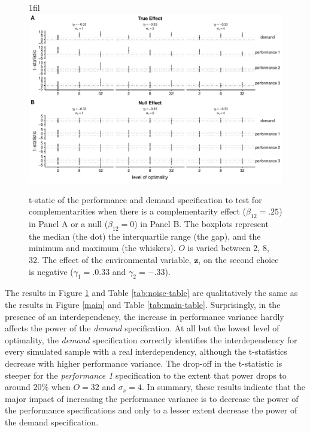 \documentclass[12pt]{article}
\makeatletter
\newcommand*{\centerfloat}{%
  \parindent \z@
  \leftskip \z@ \@plus 1fil \@minus \textwidth
  \rightskip\leftskip
  \parfillskip \z@skip}
\makeatother
\begin{document}
\begin{figure}
\centerfloat
\includegraphics[width=450px]{figure-latex/noise_new_plot.pdf}
\caption[Error Rate and Power with Increasing Levels of Variability in Performance]
{\label{noise} t-static of the performance and demand specification to test
for complementarities when there is a complementarity effect ($\beta_{12} = .25$)
in Panel A or a null ($\beta_{12} = 0$) in Panel B. The boxplots represent the median (the dot) the interquartile range (the gap), and the minimum and maximum (the whiskers). $O$ is varied between 2, 8, 32. The effect of the environmental variable, $\mathbf{z}$, on the second choice is negative ($\gamma_1 = .0.33$ and $\gamma_2 = -.33$).}
\end{figure}



The results in Figure \ref{noise} and Table \ref{tab:noise-table} are qualitatively the same as the results in Figure \ref{main} and Table \ref{tab:main-table}. Surprisingly, in the presence of an interdependency, the increase in performance variance hardly affects the power of the \emph{demand} specification. At all but the lowest level of optimality, the \emph{demand} specification correctly identifies the interdependency for every simulated sample with a real interdependency, although the t-statistics decrease with higher performance variance. The drop-off in the t-statistic is steeper for the \emph{performance 1} specification to the extent that power drops to around \(20\%\) when \(O = 32\) and \(\sigma_{\nu} = 4\). In summary, these results indicate that the major impact of increasing the performance variance is to decrease the power of the performance specifications and only to a lesser extent decrease the power of the demand specification.
\end{document}

